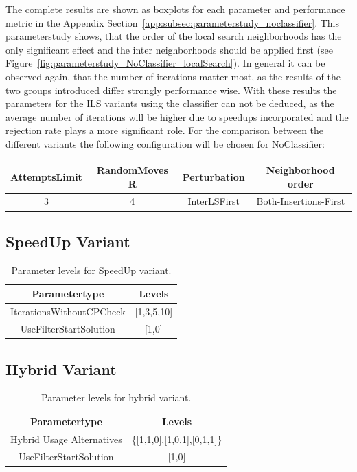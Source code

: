 The complete results are shown as boxplots for each parameter and performance metric in the Appendix Section~\ref{app:subsec:parameterstudy_noclassifier}.
This parameterstudy shows, that the order of the local search neighborhoods has the only significant effect and the inter neighborhoods
should be applied first (see Figure~\ref{fig:parameterstudy_NoClassifier_localSearch}). In general it can be observed again, that
the number of iterations matter most, as the results of the two groups introduced differ strongly performance wise. With these results
the parameters for the \gls{ILS} variants using the classifier can not be deduced, as the average number of iterations will be higher due to
speedups incorporated and the rejection rate plays a more significant role. For the comparison between the different variants the following
configuration will be chosen for NoClassifier:

\begin{table}[ht]
  \centering
  \begin{tabular}{@{}cccc@{}}
    \toprule
    AttemptsLimit & RandomMoves        R & Perturbation & Neighborhood order    \\
    \midrule
    3             & 4                    & InterLSFirst & Both-Insertions-First \\
    \bottomrule
  \end{tabular}
\end{table}

\subsection{SpeedUp Variant}
\label{subsec_parameterStuy_speedup}

\begin{table}[ht]
  \centering
  \begin{tabular}{c c }
    \toprule
    Parametertype            & Levels     \\
    \midrule
    IterationsWithoutCPCheck & [1,3,5,10] \\
    UseFilterStartSolution   & [1,0]      \\
    \bottomrule
  \end{tabular}
  \caption{Parameter levels for SpeedUp variant.}
  \label{tab:parameters_speedup}
\end{table}

\subsection{Hybrid Variant}
\label{subsec_parameterStuy_hybrid}

\begin{table}[ht]
  \centering
  \begin{tabular}{c c }
    \toprule
    Parametertype             & Levels                      \\
    \midrule
    Hybrid Usage Alternatives & \{[1,1,0],[1,0,1],[0,1,1]\} \\
    UseFilterStartSolution    & [1,0]                       \\
    \bottomrule
  \end{tabular}
  \caption{Parameter levels for hybrid variant.}
  \label{tab:parameters_hybrid}
\end{table}